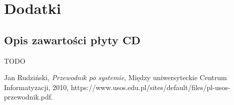 \documentclass[licencjacka]{pracamgr}
\begin{document}
\chapter{Dodatki} \label{chap:dodatki}
\section{Opis zawartości płyty CD}
TODO

\begin{thebibliography}{99}

 Jan Rudziński, \textit{Przewodnik po systemie}, Między uniwersyteckie Centrum Informatyzacji, 2010, https://www.usos.edu.pl/sites/default/files/pl-usos-przewodnik.pdf.


\end{thebibliography}
\end{document}
